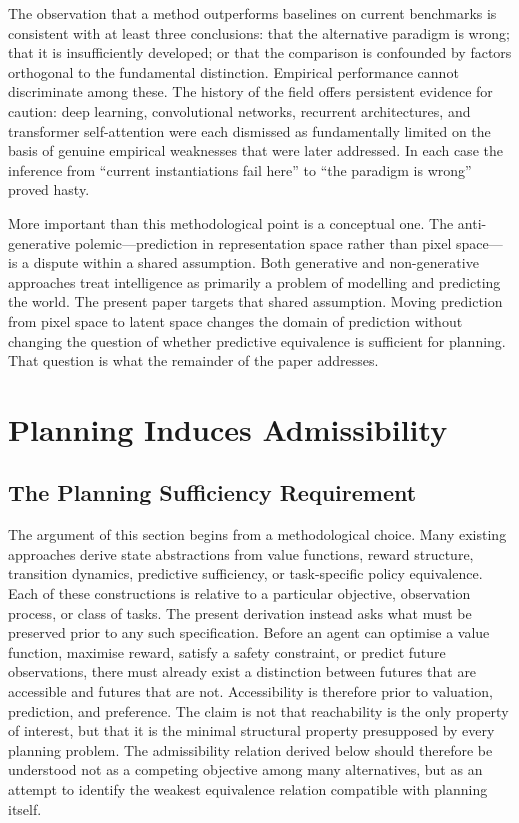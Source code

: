 \documentclass[11pt, a4paper]{article}
\theoremstyle{plain}
\theoremstyle{definition}
\theoremstyle{remark}
\begin{document}
The observation that a method outperforms baselines on current benchmarks is
consistent with at least three conclusions: that the alternative paradigm is
wrong; that it is insufficiently developed; or that the comparison is confounded
by factors orthogonal to the fundamental distinction. Empirical performance
cannot discriminate among these. The history of the field offers persistent
evidence for caution: deep learning, convolutional networks, recurrent
architectures, and transformer self-attention were each dismissed as
fundamentally limited on the basis of genuine empirical weaknesses that were
later addressed. In each case the inference from ``current instantiations fail
here'' to ``the paradigm is wrong'' proved hasty.

More important than this methodological point is a conceptual one. The
anti-generative polemic---prediction in representation space rather than pixel
space---is a dispute within a shared assumption. Both generative and
non-generative approaches treat intelligence as primarily a problem of modelling
and predicting the world. The present paper targets that shared assumption.
Moving prediction from pixel space to latent space changes the domain of
prediction without changing the question of whether predictive equivalence is
sufficient for planning. That question is what the remainder of the paper
addresses.

\section{Planning Induces Admissibility}

\subsection{The Planning Sufficiency Requirement}

The argument of this section begins from a methodological choice. Many existing
approaches derive state abstractions from value functions, reward structure,
transition dynamics, predictive sufficiency, or task-specific policy equivalence.
Each of these constructions is relative to a particular objective, observation
process, or class of tasks. The present derivation instead asks what must be
preserved prior to any such specification. Before an agent can optimise a value
function, maximise reward, satisfy a safety constraint, or predict future
observations, there must already exist a distinction between futures that are
accessible and futures that are not. Accessibility is therefore prior to
valuation, prediction, and preference. The claim is not that reachability is
the only property of interest, but that it is the minimal structural property
presupposed by every planning problem. The admissibility relation derived below
should therefore be understood not as a competing objective among many
alternatives, but as an attempt to identify the weakest equivalence relation
compatible with planning itself.
\end{document}
